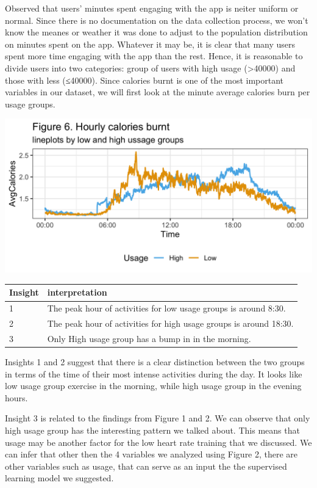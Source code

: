 \documentclass[
]{article}
\begin{document}
Observed that users' minutes spent engaging with the app is neiter
uniform or normal. Since there is no documentation on the data
collection process, we won't know the meanes or weather it was done to
adjust to the population distribution on minutes spent on the app.
Whatever it may be, it is clear that many users spent more time engaging
with the app than the rest. Hence, it is reasonable to divide users into
two categories: group of users with high usage (\textgreater40000) and
those with less (≤40000). Since calories burnt is one of the most
important variables in our dataset, we will first look at the minute
average calories burn per usage groups.

\includegraphics[width=1\linewidth]{./figs/lineplot3}

\begin{table}
\centering\begingroup\fontsize{14}{16}\selectfont

\begin{tabular}[t]{l|l}
\hline
Insight & interpretation\\
\hline
1 & The peak hour of activities for low usage groups is around 8:30.\\
\hline
2 & The peak hour of activities for high usage groups is around 18:30.\\
\hline
3 & Only High usage group has a bump in in the morning.\\
\hline
\end{tabular}
\endgroup{}
\end{table}

Insights 1 and 2 suggest that there is a clear distinction between the
two groups in terms of the time of their most intense activities during
the day. It looks like low usage group exercise in the morning, while
high usage group in the evening hours.

Insight 3 is related to the findings from Figure 1 and 2. We can observe
that only high usage group has the interesting pattern we talked about.
This means that usage may be another factor for the low heart rate
training that we discussed. We can infer that other then the 4 variables
we analyzed using Figure 2, there are other variables such as usage,
that can serve as an input the the supervised learning model we
suggested.
\end{document}

